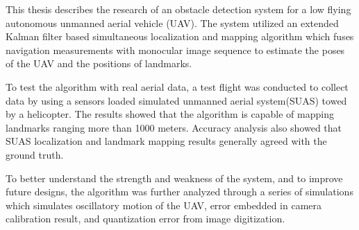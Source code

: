 \doublespacing
This thesis describes the research of an obstacle detection system for a low flying
autonomous unmanned aerial vehicle (UAV). The system utilized an
extended Kalman filter based simultaneous localization and mapping
algorithm which fuses navigation measurements with
monocular image sequence to estimate the poses of the UAV and the positions
of landmarks.

To test the algorithm with real aerial data, a test flight was conducted to
collect data by using a sensors loaded simulated unmanned aerial system(SUAS) towed
by a helicopter. 
The results showed that the algorithm is capable of mapping
landmarks ranging more than 1000 meters. Accuracy analysis also showed that SUAS localization and landmark mapping
results generally agreed with the ground truth. 

To better understand the strength and weakness of
the system, and to improve future designs, the
algorithm was further analyzed through a series of simulations which simulates oscillatory motion of the UAV, error embedded in camera calibration result, and quantization error from image digitization.
